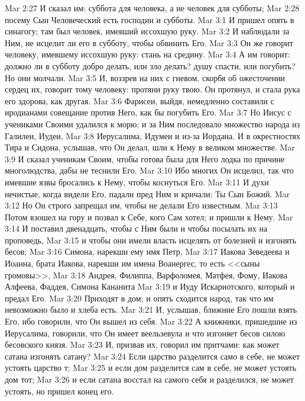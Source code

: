 \vs Mar 2:27 И сказал им: суббота для человека, а не человек для субботы;
\vs Mar 2:28 посему Сын Человеческий есть господин и субботы.
\vs Mar 3:1 И пришел опять в синагогу; там был человек, имевший иссохшую руку.
\vs Mar 3:2 И наблюдали за Ним, не исцелит ли его в субботу, чтобы обвинить Его.
\vs Mar 3:3 Он же говорит человеку, имевшему иссохшую руку: стань на средину.
\vs Mar 3:4 А им говорит: должно ли в субботу добро делать, или зло делать? душу спасти, или погубить? Но они молчали.
\vs Mar 3:5 И, воззрев на них с гневом, скорбя об ожесточении сердец их, говорит тому человеку: протяни руку твою. Он протянул, и стала рука его здорова, как другая.
\rsbpar\vs Mar 3:6 Фарисеи, выйдя, немедленно составили с иродианами совещание против Него, как бы погубить Его.
\vs Mar 3:7 Но Иисус с учениками Своими удалился к морю; и за Ним последовало множество народа из Галилеи, Иудеи,
\vs Mar 3:8 Иерусалима, Идумеи и из-за Иордана. И  в окрестностях Тира и Сидона, услышав, что Он делал, шли к Нему в великом множестве.
\vs Mar 3:9 И сказал ученикам Своим, чтобы готова была для Него лодка по причине многолюдства, дабы не теснили Его.
\vs Mar 3:10 Ибо многих Он исцелил, так что имевшие язвы бросались к Нему, чтобы коснуться Его.
\vs Mar 3:11 И духи нечистые, когда видели Его, падали пред Ним и кричали: Ты Сын Божий.
\vs Mar 3:12 Но Он строго запрещал им, чтобы не делали Его известным.
\rsbpar\vs Mar 3:13 Потом взошел на гору и позвал к Себе, кого Сам хотел; и пришли к Нему.
\vs Mar 3:14 И поставил  двенадцать, чтобы с Ним были и чтобы посылать их на проповедь,
\vs Mar 3:15 и чтобы они имели власть исцелять от болезней и изгонять бесов;
\vs Mar 3:16  Симона, нарекши ему имя Петр,
\vs Mar 3:17 Иакова Зеведеева и Иоанна, брата Иакова, нарекши им имена Воанергес, то есть <<сыны громовы>>,
\vs Mar 3:18 Андрея, Филиппа, Варфоломея, Матфея, Фому, Иакова Алфеева, Фаддея, Симона Кананита
\vs Mar 3:19 и Иуду Искариотского, который и предал Его.
\rsbpar\vs Mar 3:20 Приходят в дом; и опять сходится народ, так что им невозможно было и хлеба есть.
\vs Mar 3:21 И, услышав, ближние Его пошли взять Его, ибо говорили, что Он вышел из себя.
\vs Mar 3:22 А книжники, пришедшие из Иерусалима, говорили, что Он имеет  веельзевула и что изгоняет бесов силою бесовского князя.
\vs Mar 3:23 И, призвав их, говорил им притчами: как может сатана изгонять сатану?
\vs Mar 3:24 Если царство разделится само в себе, не может устоять царство т;
\vs Mar 3:25 и если дом разделится сам в себе, не может устоять дом тот;
\vs Mar 3:26 и если сатана восстал на самого себя и разделился, не может устоять, но пришел конец его.
